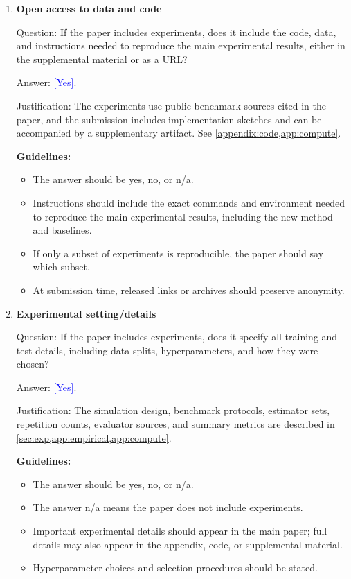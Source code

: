 \documentclass{article}
\theoremstyle{plain}
\theoremstyle{definition}
\newcommand{\1}{\mathbf{1}}
\providecommand{\answerYes}[1][]{\textcolor{blue}{[Yes]#1}}
\begin{document}
\begin{enumerate}[leftmargin=5mm]
\item \textbf{Open access to data and code}

Question: If the paper includes experiments, does it include the code, data,
and instructions needed to reproduce the main experimental results, either in
the supplemental material or as a URL?

Answer: \answerYes{}.

Justification: The experiments use public benchmark sources cited in the paper,
and the submission includes implementation sketches and can be
accompanied by a supplementary artifact. See
\cref{appendix:code,app:compute}.

\textbf{Guidelines:}
\begin{itemize}[leftmargin=5mm, noitemsep]
\item The answer should be yes, no, or n/a.
\item Instructions should include the exact commands and environment needed to
reproduce the main experimental results, including the new method and baselines.
\item If only a subset of experiments is reproducible, the paper should say
which subset.
\item At submission time, released links or archives should preserve anonymity.
\end{itemize}

\item \textbf{Experimental setting/details}

Question: If the paper includes experiments, does it specify all training and
test details, including data splits, hyperparameters, and how they were chosen?

Answer: \answerYes{}.

Justification: The simulation design, benchmark protocols, estimator sets,
repetition counts, evaluator sources, and summary metrics are described in
\cref{sec:exp,app:empirical,app:compute}.

\textbf{Guidelines:}
\begin{itemize}[leftmargin=5mm, noitemsep]
\item The answer should be yes, no, or n/a.
\item The answer n/a means the paper does not include experiments.
\item Important experimental details should appear in the main paper; full
details may also appear in the appendix, code, or supplemental material.
\item Hyperparameter choices and selection procedures should be stated.
\end{itemize}


\end{enumerate}
\end{document}
